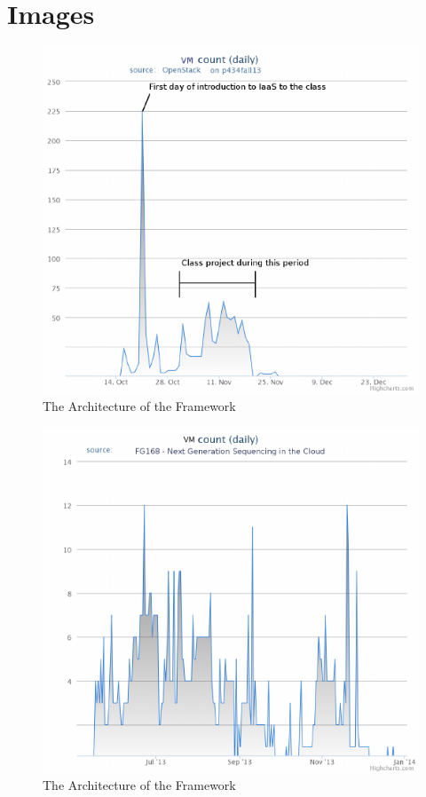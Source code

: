 \documentclass{sig-alternate}
\begin{document}
\section{Images}



\begin{figure}[htb] 
  \centering 
    \includegraphics[width=1.0\columnwidth]{images/fig1.pdf} 
  \caption{The Architecture of the Framework}\label{F:fig1} 
\end{figure} 

\begin{figure}[htb] 
  \centering 
    \includegraphics[width=1.0\columnwidth]{images/fig2.pdf} 
  \caption{The Architecture of the Framework}\label{F:fig2} 
\end{figure} 
\end{document}
